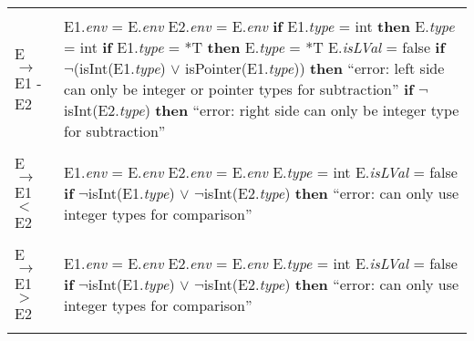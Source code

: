 \documentclass{article}
\begin{document}
\begin{center}
\begin{longtable}{ |l|l| }
     & \\
    
    E $\rightarrow$ E1 - E2 & \makecell[l]{E1.\textit{env} = E.\textit{env} \\ E2.\textit{env} = E.\textit{env} \\ \textbf{if} E1.\textit{type} = int \textbf{then} E.\textit{type} = int \\ \textbf{if} E1.\textit{type} = *T \textbf{then} E.\textit{type} = *T \\ E.\textit{isLVal} = false \\ \textbf{if} $\neg$(isInt(E1.\textit{type}) $\lor$ isPointer(E1.\textit{type})) \\ \textbf{then} ``error: left side can only be integer or pointer types \\ for subtraction'' \\ \textbf{if} $\neg$isInt(E2.\textit{type}) \\ \textbf{then} ``error: right side can only be integer type for \\ subtraction''} \\
    
     & \\
    
    E $\rightarrow$ E1 $<$ E2 & \makecell[l]{E1.\textit{env} = E.\textit{env} \\ E2.\textit{env} = E.\textit{env} \\ E.\textit{type} = int \\ E.\textit{isLVal} = false \\ \textbf{if} $\neg$isInt(E1.\textit{type}) $\lor$ $\neg$isInt(E2.\textit{type}) \\ \textbf{then} ``error: can only use integer types for comparison''} \\
    
     & \\
    
    E $\rightarrow$ E1 $>$ E2 & \makecell[l]{E1.\textit{env} = E.\textit{env} \\ E2.\textit{env} = E.\textit{env} \\ E.\textit{type} = int \\ E.\textit{isLVal} = false \\ \textbf{if} $\neg$isInt(E1.\textit{type}) $\lor$ $\neg$isInt(E2.\textit{type}) \\ \textbf{then} ``error: can only use integer types for comparison''} \\
    
     & \\
    

\end{longtable}
\end{center}
\end{document}
